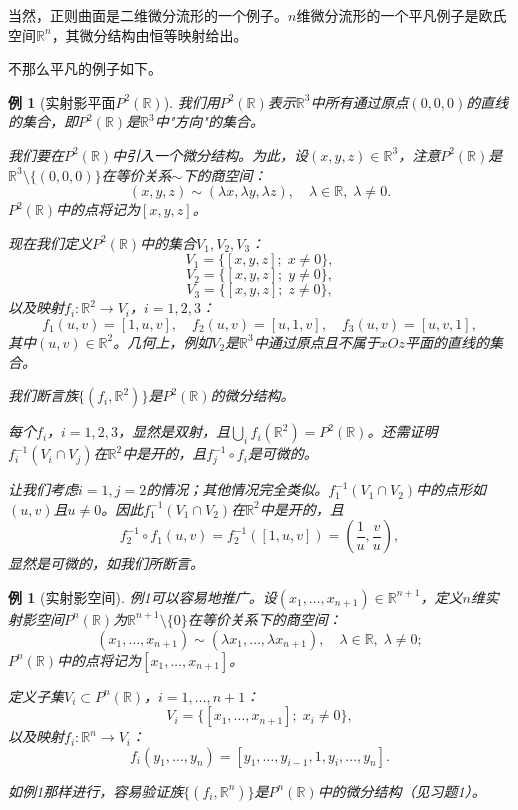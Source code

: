 \documentclass[12pt,a4paper]{ctexbook}
\newtheorem{example}[theorem]{例}
\begin{document}
当然，正则曲面是二维微分流形的一个例子。$n$维微分流形的一个平凡例子是欧氏空间$\mathbb{R}^n$，其微分结构由恒等映射给出。

不那么平凡的例子如下。

\begin{example}[实射影平面$P^2(\mathbb{R})$]
我们用$P^2(\mathbb{R})$表示$\mathbb{R}^3$中所有通过原点$(0,0,0)$的直线的集合，即$P^2(\mathbb{R})$是$\mathbb{R}^3$中"方向"的集合。

我们要在$P^2(\mathbb{R})$中引入一个微分结构。为此，设$(x,y,z)\in\mathbb{R}^3$，注意$P^2(\mathbb{R})$是$\mathbb{R}^3\setminus\{(0,0,0)\}$在等价关系$\sim$下的商空间：
$$(x,y,z)\sim(\lambda x,\lambda y,\lambda z),\quad \lambda\in\mathbb{R},\;\lambda\neq 0.$$
$P^2(\mathbb{R})$中的点将记为$[x,y,z]$。

现在我们定义$P^2(\mathbb{R})$中的集合$V_1,V_2,V_3$：
$$V_1 = \{[x,y,z];\; x\neq 0\},$$
$$V_2 = \{[x,y,z];\; y\neq 0\},$$
$$V_3 = \{[x,y,z];\; z\neq 0\},$$
以及映射$f_i:\mathbb{R}^2\to V_i$，$i=1,2,3$：
$$f_1(u,v) = [1,u,v],\quad f_2(u,v) = [u,1,v],\quad f_3(u,v) = [u,v,1],$$
其中$(u,v)\in\mathbb{R}^2$。几何上，例如$V_2$是$\mathbb{R}^3$中通过原点且不属于$xOz$平面的直线的集合。

我们断言族$\{(f_i,\mathbb{R}^2)\}$是$P^2(\mathbb{R})$的微分结构。

每个$f_i$，$i=1,2,3$，显然是双射，且$\bigcup_i f_i(\mathbb{R}^2) = P^2(\mathbb{R})$。还需证明$f_i^{-1}(V_i\cap V_j)$在$\mathbb{R}^2$中是开的，且$f_j^{-1}\circ f_i$是可微的。

让我们考虑$i=1,j=2$的情况；其他情况完全类似。$f_1^{-1}(V_1\cap V_2)$中的点形如$(u,v)$且$u\neq 0$。因此$f_1^{-1}(V_1\cap V_2)$在$\mathbb{R}^2$中是开的，且
$$f_2^{-1}\circ f_1(u,v) = f_2^{-1}([1,u,v]) = \left(\frac{1}{u},\frac{v}{u}\right),$$
显然是可微的，如我们所断言。
\end{example}

\begin{example}[实射影空间]
例1可以容易地推广。设$(x_1,\ldots,x_{n+1})\in\mathbb{R}^{n+1}$，定义$n$维实射影空间$P^n(\mathbb{R})$为$\mathbb{R}^{n+1}\setminus\{0\}$在等价关系下的商空间：
$$(x_1,\ldots,x_{n+1})\sim(\lambda x_1,\ldots,\lambda x_{n+1}),\quad \lambda\in\mathbb{R},\;\lambda\neq 0;$$
$P^n(\mathbb{R})$中的点将记为$[x_1,\ldots,x_{n+1}]$。

定义子集$V_i\subset P^n(\mathbb{R})$，$i=1,\ldots,n+1$：
$$V_i = \{[x_1,\ldots,x_{n+1}];\; x_i\neq 0\},$$
以及映射$f_i:\mathbb{R}^n\to V_i$：
$$f_i(y_1,\ldots,y_n) = [y_1,\ldots,y_{i-1},1,y_i,\ldots,y_n].$$

如例1那样进行，容易验证族$\{(f_i,\mathbb{R}^n)\}$是$P^n(\mathbb{R})$中的微分结构（见习题1）。
\end{example}
\end{document}
